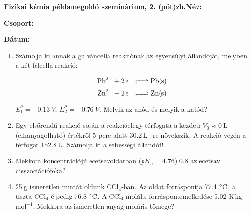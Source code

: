 \documentclass[a4paper, 11pt]{article}
\begin{document}
\textbf{Fizikai kémia példamegoldó szeminárium, 2. (pót)zh.}\hfill \textbf{Név:}

\hfill \textbf{Csoport:}

\hfill \textbf{Dátum:}

\thispagestyle{empty}

\begin{enumerate}

\item Számolja ki annak a galváncella reakciónak az egyensúlyi állandóját, melyben a két félcella reakció:
 
\begin{equation}
        \ce{Pb^{2+} + 2e^- <=> Pb(s)}
\end{equation}
\begin{equation}
        \ce{Zn^{2+} + 2e^- <=> Zn(s)}
\end{equation}

$E_1^\theta=-0.13~V$, $E_2^\theta=-0.76~V$. Melyik az anód és melyik a katód? 

\item Egy elsőrendű reakció során a reakcióelegy térfogata a kezdeti $V_0\approx0~$L (elhanyagolható) értékről 5 perc alatt $30.2~$L$-$re növekszik. A reakció végén a térfogat 152.8$~$L. Számolja ki a sebességi állandót!

\item Mekkora koncentrációjú ecetsavoldatban ($pK_a=4.76$) 0.8 az ecetsav disszociációfoka?

\item 25$~$g ismeretlen mintát oldunk CCl$_4$-ban. Az oldat forráspontja 77.4$~\celsius$, a tiszta CCl$_4$-é pedig 76.8$~\celsius$. A CCl$_4$ molális forráspontemelkedése 5.02 K$\,$kg$\,$mol$^{-1}$. Mekkora az ismeretlen anyag moláris tömege?

\end{enumerate}
\end{document}
